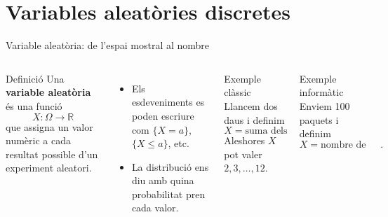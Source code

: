 \documentclass[10pt,aspectratio=169]{beamer}
\newcommand{\important}[1]{\textcolor{UABGreen}{\textbf{#1}}}
\begin{document}
\section{Variables aleatòries discretes}

\begin{frame}{Variable aleatòria: de l'espai mostral al nombre}
\begin{columns}[T]
\begin{block}{Definició}
Una \important{variable aleatòria} és una funció
\[
X:\Omega\longrightarrow \mathbb{R}
\]
que assigna un valor numèric a cada resultat possible d'un experiment aleatori.
\end{block}
\begin{itemize}
  \item Els esdeveniments es poden escriure com $\{X=a\}$, $\{X\leq a\}$, etc.
  \item La distribució ens diu amb quina probabilitat pren cada valor.
\end{itemize}
\begin{block}{Exemple clàssic}
Llancem dos daus i definim
\[
X=\text{suma dels resultats}.
\]
Aleshores $X$ pot valer $2,3,\ldots,12$.
\end{block}
\begin{block}{Exemple informàtic}
Enviem 100 paquets i definim
\[
X=\text{nombre de paquets perduts}.
\]
\end{block}
\end{columns}
\end{frame}
\end{document}
